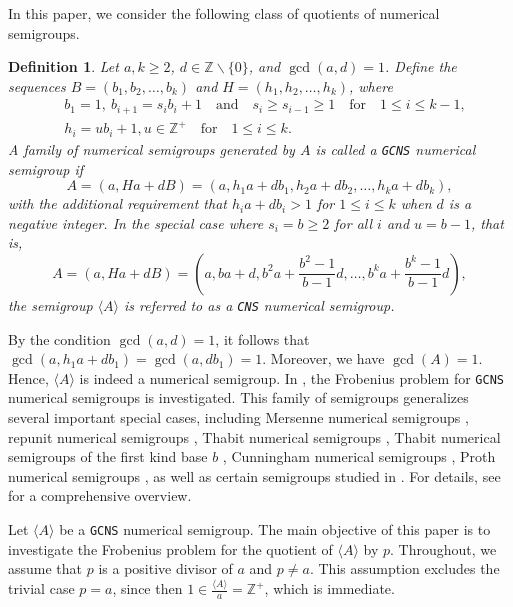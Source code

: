 \documentclass[reqno, 12pt]{article}
\theoremstyle{mydefinition}
\newtheorem{dfn}[thm]{Definition}
\theoremstyle{myremark}
\numberwithin{algorithm}{section}
\begin{document}
In this paper, we consider the following class of quotients of numerical semigroups.
\begin{dfn}{\em \cite{LiuSemigroupF}}
Let $a,k\geq 2$, $d\in\mathbb{Z}\backslash \{0\}$, and $\gcd(a,d)=1$.
Define the sequences $B=(b_1,b_2,\ldots,b_k)$ and $H=(h_1,h_2,\ldots,h_k)$, where
\begin{align}
& b_1=1,\ b_{i+1}=s_ib_i+1\quad \text{and}\quad s_i\geq s_{i-1}\geq 1\quad \text{for}\quad 1\leq i\leq k-1,\label{BBcondition}
\\& h_i=ub_i+1, u\in \mathbb{Z}^{+}\quad \text{for}\quad 1\leq i\leq k.\label{HHcondition}
\end{align}
A family of numerical semigroups generated by $A$ is called a \emph{\texttt{GCNS} numerical semigroup} if
$$A=(a,Ha+dB)=(a,h_1a+db_1,h_2a+db_2,\ldots,h_ka+db_k),$$
with the additional requirement that $h_ia+db_i>1$ for $1\leq i\leq k$ when $d$ is a negative integer.
In the special case where $s_i=b\geq 2$ for all $i$ and $u=b-1$, that is, 
$$A=(a,Ha+dB)=\left(a,ba+d,b^2a+\frac{b^2-1}{b-1}d,\ldots,b^ka+\frac{b^k-1}{b-1}d\right),$$
the semigroup $\langle A\rangle$ is referred to as a \emph{\texttt{CNS} numerical semigroup}.
\end{dfn}

By the condition $\gcd(a, d) = 1$, it follows that $\gcd(a, h_1 a + d b_1) = \gcd(a, d b_1) = 1.$  
Moreover, we have $\gcd(A) = 1$. Hence, $\langle A \rangle$ is indeed a numerical semigroup.
In \cite{LiuSemigroupF}, the Frobenius problem for \texttt{GCNS} numerical semigroups is investigated.
This family of semigroups generalizes several important special cases, including Mersenne numerical semigroups \cite{Rosales2016}, repunit numerical semigroups \cite{Rosales.Repunit}, Thabit numerical semigroups \cite{Rosales2015}, Thabit numerical semigroups of the first kind base $b$ \cite{KyunghwanSong2020}, Cunningham numerical semigroups \cite{KyunghwanSong2020}, Proth numerical semigroups \cite{P.Srivastava}, as well as certain semigroups studied in \cite{GuZeTang,GuZe2020,KyunghwanSong}. For details, see \cite{LiuSemigroupF} for a comprehensive overview.


Let $\langle A\rangle$ be a \texttt{GCNS} numerical semigroup.
The main objective of this paper is to investigate the Frobenius problem for the quotient of $\langle A\rangle$ by $p$.
Throughout, we assume that $p$ is a positive divisor of $a$ and $p\neq a$.
This assumption excludes the trivial case $p = a$, since then $1\in \frac{\langle A \rangle}{a} = \mathbb{Z}^{+}$, which is immediate.
\end{document}
